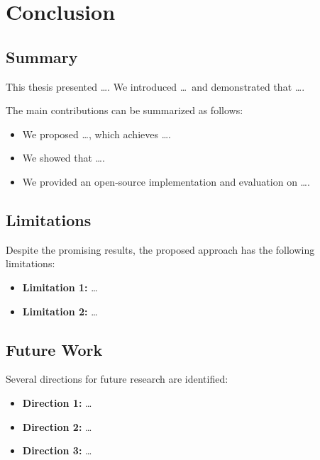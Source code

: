 \chapter{Conclusion}
\label{ch:conclusion}

\section{Summary}
\label{sec:summary}

This thesis presented \ldots. We introduced \ldots\ and demonstrated that \ldots.

The main contributions can be summarized as follows:

\begin{itemize}
  \item We proposed \ldots, which achieves \ldots.
  \item We showed that \ldots.
  \item We provided an open-source implementation and evaluation on \ldots.
\end{itemize}

\section{Limitations}
\label{sec:limitations}

Despite the promising results, the proposed approach has the following limitations:

\begin{itemize}
  \item \textbf{Limitation 1:} \ldots
  \item \textbf{Limitation 2:} \ldots
\end{itemize}

\section{Future Work}
\label{sec:future_work}

Several directions for future research are identified:

\begin{itemize}
  \item \textbf{Direction 1:} \ldots
  \item \textbf{Direction 2:} \ldots
  \item \textbf{Direction 3:} \ldots
\end{itemize}
